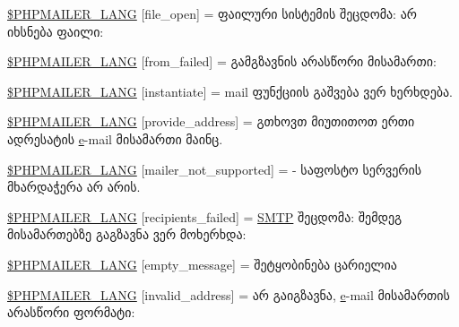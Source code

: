 \begin{DoxyCompactItemize}
\item 
\hyperlink{phpmailer_8lang-ka_8php_a28d1a6517bf4c942a0ddd506188ad2e0}{\$\+P\+H\+P\+M\+A\+I\+L\+E\+R\+\_\+\+L\+A\+NG} \mbox{[}\textquotesingle{}file\+\_\+open\textquotesingle{}\mbox{]} = \textquotesingle{}ფაილური სისტემის შეცდომა\+: არ იხსნება ფაილი\+: \textquotesingle{}
\item 
\hyperlink{phpmailer_8lang-ka_8php_adf832ae12155a09be077c6d5e4fd7e22}{\$\+P\+H\+P\+M\+A\+I\+L\+E\+R\+\_\+\+L\+A\+NG} \mbox{[}\textquotesingle{}from\+\_\+failed\textquotesingle{}\mbox{]} = \textquotesingle{}გამგზავნის არასწორი მისამართი\+: \textquotesingle{}
\item 
\hyperlink{phpmailer_8lang-ka_8php_ad58dde16780f4770ccf4dd282ea1f5ad}{\$\+P\+H\+P\+M\+A\+I\+L\+E\+R\+\_\+\+L\+A\+NG} \mbox{[}\textquotesingle{}instantiate\textquotesingle{}\mbox{]} = \textquotesingle{}mail ფუნქციის გაშვება ვერ ხერხდება.\textquotesingle{}
\item 
\hyperlink{phpmailer_8lang-ka_8php_a8b97897c2406b7392b056f375feeefbb}{\$\+P\+H\+P\+M\+A\+I\+L\+E\+R\+\_\+\+L\+A\+NG} \mbox{[}\textquotesingle{}provide\+\_\+address\textquotesingle{}\mbox{]} = \textquotesingle{}გთხოვთ მიუთითოთ ერთი ადრესატის \hyperlink{jquery-ui_8min_8js_abea95a4e94bc6f4151d5683d4c12c3f4}{e}-\/mail მისამართი მაინც.\textquotesingle{}
\item 
\hyperlink{phpmailer_8lang-ka_8php_aa2ebcb8833ee83a7ad67401c4bb3a6ad}{\$\+P\+H\+P\+M\+A\+I\+L\+E\+R\+\_\+\+L\+A\+NG} \mbox{[}\textquotesingle{}mailer\+\_\+not\+\_\+supported\textquotesingle{}\mbox{]} = \textquotesingle{} -\/ საფოსტო სერვერის მხარდაჭერა არ არის.\textquotesingle{}
\item 
\hyperlink{phpmailer_8lang-ka_8php_a7589d30bb9b368327c2df015f3e6bcba}{\$\+P\+H\+P\+M\+A\+I\+L\+E\+R\+\_\+\+L\+A\+NG} \mbox{[}\textquotesingle{}recipients\+\_\+failed\textquotesingle{}\mbox{]} = \textquotesingle{}\hyperlink{class_s_m_t_p}{S\+M\+TP} შეცდომა\+: შემდეგ მისამართებზე გაგზავნა ვერ მოხერხდა\+: \textquotesingle{}
\item 
\hyperlink{phpmailer_8lang-ka_8php_a33772099f637c9d6c2cd7425e0e37fed}{\$\+P\+H\+P\+M\+A\+I\+L\+E\+R\+\_\+\+L\+A\+NG} \mbox{[}\textquotesingle{}empty\+\_\+message\textquotesingle{}\mbox{]} = \textquotesingle{}შეტყობინება ცარიელია\textquotesingle{}
\item 
\hyperlink{phpmailer_8lang-ka_8php_a42d61bcea4c79599ecb44fd062f54d47}{\$\+P\+H\+P\+M\+A\+I\+L\+E\+R\+\_\+\+L\+A\+NG} \mbox{[}\textquotesingle{}invalid\+\_\+address\textquotesingle{}\mbox{]} = \textquotesingle{}არ გაიგზავნა, \hyperlink{jquery-ui_8min_8js_abea95a4e94bc6f4151d5683d4c12c3f4}{e}-\/mail მისამართის არასწორი ფორმატი\+: \textquotesingle{}

\end{DoxyCompactItemize}
